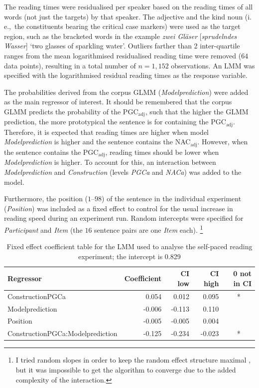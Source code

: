\documentclass[USenglish]{article}
\newcommand{\ie}{i.\,e.,}
\newcommand{\Sub}[1]{\ensuremath{\mathrm{_{#1}}}}
\newcommand{\NACa}{NAC\Sub{adj}}
\newcommand{\PGCa}{PGC\Sub{adj}}
\begin{document}
The reading times were residualised per speaker based on the reading times of all words (not just the targets) by that speaker.
The adjective and the kind noun (\ie\ the constituents bearing the critical case markers) were used as the target region, such as the bracketed words in the example \textit{zwei Gläser} [\textit{spru\-deln\-des Wasser}] `two glasses of sparkling water'.
Outliers farther than 2 inter-quartile ranges from the mean logarithmised residualised reading time were removed ($64$ data points), resulting in a total number of $n=1,152$ observations.
An LMM was specified with the logarithmised residual reading times as the response variable.

The probabilities derived from the corpus GLMM (\textit{Modelprediction}) were added as the main regressor of interest.
It should be remembered that the corpus GLMM predicts the probability of the \PGCa, such that the higher the GLMM prediction, the more prototypical the sentence is for containing the \PGCa.
Therefore, it is expected that reading times are higher when model \textit{Modelprediction} is higher and the sentence contains the \NACa.
However, when the sentence contains the \PGCa, reading times should be lower when \textit{Modelprediction} is higher.
To account for this, an interaction between \textit{Modelprediction} and \textit{Construction} (levels \textit{PGCa} and \textit{NACa}) was added to the model.

Furthermore, the position ($1$--$98$) of the sentence in the individual experiment (\textit{Position}) was included as a fixed effect to control for the usual increase in reading speed during an experiment run.
Random intercepts were specified for \textit{Participant} and \textit{Item} (the $16$ sentence pairs are one \textit{Item} each).%
\footnote{I tried random slopes in order to keep the random effect structure maximal \citep{BarrEa2013}, but it was impossible to get the algorithm to converge due to the added complexity of the interaction.}

\begin{table}
  \centering
  \begin{tabular}{lrrrc}
    Regressor & \multicolumn{1}{r}{Coefficient} & \multicolumn{1}{r}{CI low} & \multicolumn{1}{r}{CI high} & \multicolumn{1}{r}{0 not in CI} \\ \midrule
    ConstructionPGCa                 &  0.054 &  0.012 &  0.095 &  *  \\ 
    Modelprediction                  & -0.006 & -0.113 &  0.110 &     \\ 
    Position                         & -0.005 & -0.005 &  0.004 &     \\ 
    ConstructionPGCa:Modelprediction & -0.125 & -0.234 & -0.023 &  *  \\ 
  \end{tabular}
  \caption{Fixed effect coefficient table for the LMM used to analyse the self-paced reading experiment; the intercept is 0.829}
  \label{tab:exp:spr}
\end{table}
\end{document}
